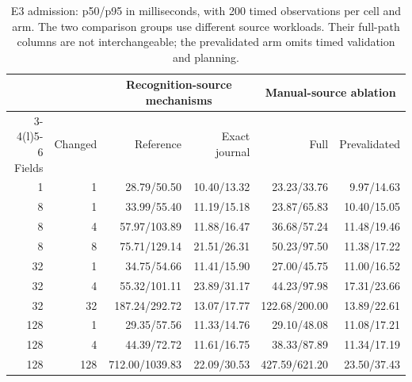 \begin{table}[tb]
\centering
\footnotesize
\caption{E3 admission: p50/p95 in milliseconds, with 200 timed observations per cell and arm. The two comparison groups use different source workloads. Their full-path columns are not interchangeable; the prevalidated arm omits timed validation and planning.}
\label{tab:dke-admission}
\setlength{\tabcolsep}{3pt}
\begin{tabular}{@{}rr r r r r@{}}
\toprule
 & & \multicolumn{2}{c}{Recognition-source mechanisms} & \multicolumn{2}{c}{Manual-source ablation} \\
\cmidrule(lr){3-4}\cmidrule(l){5-6}
Fields & Changed & Reference & Exact journal & Full & Prevalidated \\
\midrule
1 & 1 & 28.79/50.50 & 10.40/13.32 & 23.23/33.76 & 9.97/14.63 \\
8 & 1 & 33.99/55.40 & 11.19/15.18 & 23.87/65.83 & 10.40/15.05 \\
8 & 4 & 57.97/103.89 & 11.88/16.47 & 36.68/57.24 & 11.48/19.46 \\
8 & 8 & 75.71/129.14 & 21.51/26.31 & 50.23/97.50 & 11.38/17.22 \\
32 & 1 & 34.75/54.66 & 11.41/15.90 & 27.00/45.75 & 11.00/16.52 \\
32 & 4 & 55.32/101.11 & 23.89/31.17 & 44.23/97.98 & 17.31/23.66 \\
32 & 32 & 187.24/292.72 & 13.07/17.77 & 122.68/200.00 & 13.89/22.61 \\
128 & 1 & 29.35/57.56 & 11.33/14.76 & 29.10/48.08 & 11.08/17.21 \\
128 & 4 & 44.39/72.72 & 11.61/16.75 & 38.33/87.89 & 11.34/17.19 \\
128 & 128 & 712.00/1039.83 & 22.09/30.53 & 427.59/621.20 & 23.50/37.43 \\
\bottomrule
\end{tabular}
\end{table}
